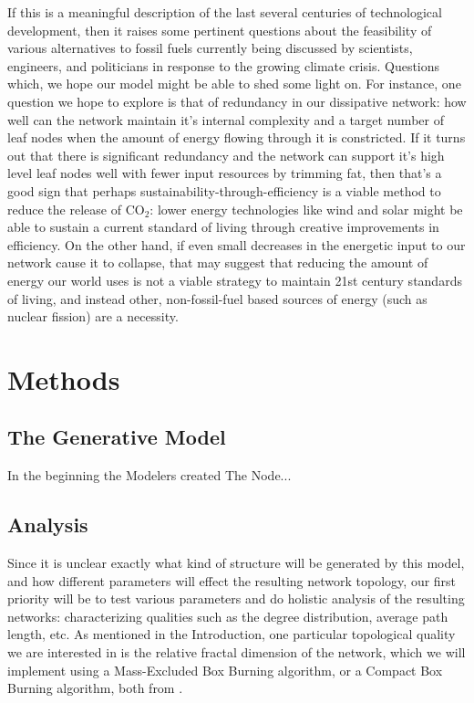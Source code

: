 \documentclass{paper}
\begin{document}
	If this is a meaningful description of the last several centuries of technological development, then it raises some pertinent questions about the feasibility of various alternatives to fossil fuels currently being discussed by scientists, engineers, and politicians in response to the growing climate crisis. Questions which, we hope our model might be able to shed some light on. For instance, one question we hope to explore is that of redundancy in our dissipative network: how well can the network maintain it's internal complexity and a target number of leaf nodes when the amount of energy flowing through it is constricted. If it turns out that there is significant redundancy and the network can support it's high level leaf nodes well with fewer input resources by trimming fat, then that's a good sign that perhaps sustainability-through-efficiency is a viable method to reduce the release of CO$_{2}$: lower energy technologies like wind and solar might be able to sustain a current standard of living through creative improvements in efficiency. On the other hand, if even small decreases in the energetic input to our network cause it to collapse, that may suggest that reducing the amount of energy our world uses is not a viable strategy to maintain 21st century standards of living, and instead other, non-fossil-fuel based sources of energy (such as nuclear fission) are a necessity. 
	
	\section{Methods}
	
	\subsection{The Generative Model}
	
	In the beginning the Modelers created The Node...
	
	\subsection{Analysis}
	Since it is unclear exactly what kind of structure will be generated by this model, and how different parameters will effect the resulting network topology, our first priority will be to test various parameters and do holistic analysis of the resulting networks: characterizing qualities such as the degree distribution, average path length, etc. As mentioned in the Introduction, one particular topological quality we are interested in is the relative fractal dimension of the network, which we will implement using a Mass-Excluded Box Burning algorithm, or a Compact Box Burning algorithm, both from \cite{song_how_2007}. 
	
\end{document}

